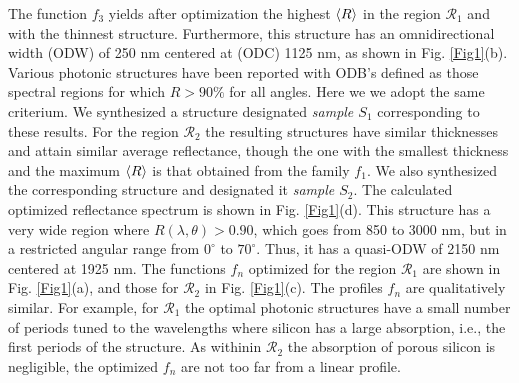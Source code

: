 \documentclass[a4paper,fleqn]{cas-sc}
\begin{document}
The function $f_{3}$ yields after optimization the highest
$\braket{R}$ in the region $\mathcal R_1$ and with the thinnest
structure. Furthermore, this
structure has an omnidirectional width (ODW) of 250 nm
centered at (ODC) 1125 nm, as shown in Fig. \ref{Fig1}(b).  Various
photonic structures have been reported with
ODB's \cite{Xu2018,Ahmed2014,Reiner2000} defined as those spectral regions for
which $R>90\%$ for all angles. Here we we adopt the same criterium.
We synthesized a structure designated {\em sample $S_1$} corresponding
to these results. For the region $\mathcal R_2$ the
resulting structures have similar thicknesses and attain similar average reflectance,
though the one with the smallest thickness and the maximum $\braket{R}$
is that obtained from the family $f_{1}$. We
also synthesized the corresponding
structure and designated it {\em sample $S_2$}. The
calculated optimized reflectance spectrum is shown in Fig. \ref{Fig1}(d).
This structure has a very wide region where $R(\lambda, \theta)>
0.90$, which goes from 850 to 3000 nm, but in a restricted angular range
from $0^\circ$ to $70^\circ$. Thus, it has a
quasi-ODW of 2150 nm centered at 1925 nm.
The functions $f_n$ optimized for the region $\mathcal R_1$ are shown
in Fig. \ref{Fig1}(a), and those for $\mathcal R_2$
in Fig. \ref{Fig1}(c). The profiles $f_n$ are qualitatively
similar. For example, for $\mathcal R_1$ the optimal photonic
structures have a small number of periods tuned to the wavelengths where
silicon has a large absorption, i.e.,  the first periods of the
structure.
As withinin $\mathcal R_2$ the absorption of porous silicon is negligible, the optimized $f_n$ are not too
far from a linear profile.
\end{document}
